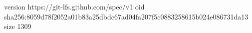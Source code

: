 version https://git-lfs.github.com/spec/v1
oid sha256:8059d78f2052a01b83a25dbdc67ad04fa207f5c0883258615b024e086731da13
size 1309
